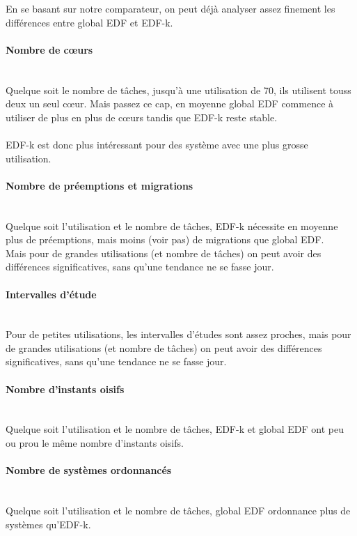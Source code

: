 \documentclass[a4paper,10pt]{article}
\begin{document}
 	En se basant sur notre comparateur, on peut déjà analyser assez finement les différences entre global EDF et EDF-k.\\
	
	\paragraph*{Nombre de cœurs}~\\
		Quelque soit le nombre de tâches, jusqu'à une utilisation de 70, ils utilisent touss deux un seul cœur.
		Mais passez ce cap, en moyenne global EDF commence à utiliser de plus en plus de cœurs tandis que EDF-k reste stable.\\
		~\\
		EDF-k est donc plus intéressant pour des système avec une plus grosse utilisation.
		
	\paragraph*{Nombre de préemptions et migrations}~\\

		Quelque soit l'utilisation et le nombre de tâches, EDF-k nécessite en moyenne plus de préemptions, mais moins (voir pas) de migrations que global EDF.\\
		Mais pour de grandes utilisations (et nombre de tâches) on peut avoir des différences significatives, sans qu'une tendance ne se fasse jour.
		
	\paragraph*{Intervalles d'étude}~\\
		Pour de petites utilisations, les intervalles d'études sont assez proches, mais pour de grandes utilisations (et nombre de tâches) on peut avoir des différences significatives, sans qu'une tendance ne se fasse jour.
		

	\paragraph*{Nombre d'instants oisifs}~\\
		Quelque soit l'utilisation et le nombre de tâches, EDF-k et global EDF ont peu ou prou le même nombre d'instants oisifs.
		
	\paragraph*{Nombre de systèmes ordonnancés}~\\
		Quelque soit l'utilisation et le nombre de tâches, global EDF ordonnance plus de systèmes qu'EDF-k.
\end{document}
